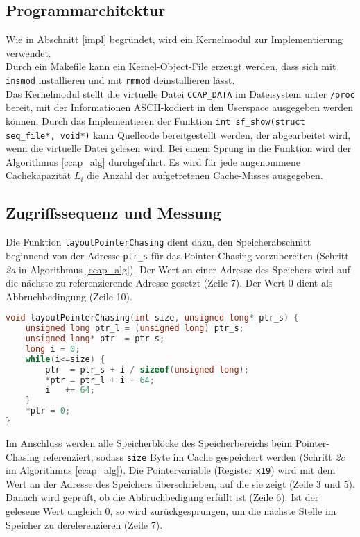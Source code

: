 \documentclass[]{scrbook}
\begin{document}
\subsection{Programmarchitektur}



Wie in Abschnitt \ref{impl} begründet, wird ein Kernelmodul zur Implementierung verwendet. 
\\
Durch ein Makefile kann ein Kernel-Object-File erzeugt werden, dass sich mit \texttt{insmod} installieren und mit \texttt{rmmod} deinstallieren lässt.
\\
Das Kernelmodul stellt die virtuelle Datei \texttt{CCAP\_DATA} im Dateisystem unter \texttt{/proc} bereit, mit der Informationen ASCII-kodiert in den Userspace ausgegeben werden können.
Durch das Implementieren der Funktion \texttt{int sf\_show(struct seq\_file*, void*)} kann Quellcode bereitgestellt werden, der abgearbeitet wird, wenn die virtuelle Datei gelesen wird.
Bei einem Sprung in die Funktion wird der Algorithmus \ref{ccap_alg} durchgeführt. \cite[S.\,280 ff.]{lte}
Es wird für jede angenommene Cachekapazität $L_i$ die Anzahl der aufgetretenen Cache-Misses ausgegeben.

\subsection{Zugriffssequenz und Messung}

Die Funktion \texttt{layoutPointerChasing} dient dazu, den Speicherabschnitt beginnend von der Adresse \texttt{ptr\_s} für das Pointer-Chasing vorzubereiten (Schritt \textit{2a} in Algorithmus \ref{ccap_alg}).
Der Wert an einer Adresse des Speichers wird auf die nächste zu referenzierende Adresse gesetzt (Zeile 7).
Der Wert $0$ dient als Abbruchbedingung (Zeile 10).

\begin{lstlisting}[language=C, caption=Funktion zum Vorbereiten eines \texttt{size} Byte großen Abschnitt des Speichers für das Pointer-Chasing, label=ccap_pointerChasing, escapechar=\%]
void layoutPointerChasing(int size, unsigned long* ptr_s) {
	unsigned long ptr_l = (unsigned long) ptr_s;
	unsigned long* ptr  = ptr_s;
	long i = 0;
	while(i<=size) {
		ptr  = ptr_s + i / sizeof(unsigned long);
		*ptr = ptr_l + i + 64;
		i   += 64;
	}
	*ptr = 0;
}
\end{lstlisting}

Im Anschluss werden alle Speicherblöcke des Speicherbereichs beim Pointer-Chasing referenziert, sodass \texttt{size} Byte im Cache gespeichert werden (Schritt \textit{2c} im Algorithmus \ref{ccap_alg}).
Die Pointervariable (Register \texttt{x19}) wird mit dem Wert an der Adresse des Speichers überschrieben, auf die sie zeigt (Zeile 3 und 5).
Danach wird geprüft, ob die Abbruchbedigung erfüllt ist (Zeile 6).
Ist der gelesene Wert ungleich $0$, so wird zurückgesprungen, um die nächste Stelle im Speicher zu dereferenzieren (Zeile 7).
\end{document}
